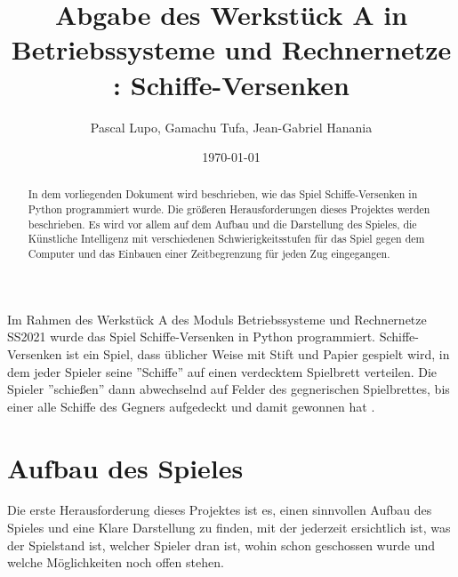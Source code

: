 \documentclass{article}
\title{Abgabe des Werkstück A in Betriebssysteme und Rechnernetze : Schiffe-Versenken}
\author{Pascal Lupo, Gamachu Tufa, Jean-Gabriel Hanania}
\date{\today}
\begin{document}
\maketitle
\thispagestyle{empty} %

\begin{abstract}
    In dem vorliegenden Dokument wird beschrieben, wie das Spiel Schiffe-Versenken in Python programmiert wurde. Die größeren Herausforderungen dieses Projektes werden beschrieben. Es wird vor allem auf dem Aufbau und die Darstellung des Spieles, die Künstliche Intelligenz mit verschiedenen Schwierigkeitsstufen für das Spiel gegen dem Computer und das Einbauen einer Zeitbegrenzung für jeden Zug eingegangen.
\end{abstract}

\section*{}
    Im Rahmen des Werkstück A des Moduls Betriebssysteme und Rechnernetze SS2021 wurde das Spiel Schiffe-Versenken in Python programmiert. Schiffe-Versenken ist ein Spiel, dass üblicher Weise mit Stift und Papier gespielt wird, in dem jeder Spieler seine ''Schiffe'' auf einen verdecktem Spielbrett verteilen. Die Spieler ''schießen'' dann abwechselnd auf Felder des gegnerischen Spielbrettes, bis einer alle Schiffe des Gegners aufgedeckt und damit gewonnen hat .


\section{Aufbau des Spieles}
    Die erste Herausforderung dieses Projektes ist es, einen sinnvollen Aufbau des Spieles und eine Klare Darstellung zu finden, mit der jederzeit ersichtlich ist, was der Spielstand ist, welcher Spieler dran ist, wohin schon geschossen wurde und welche Möglichkeiten noch offen stehen.
\end{document}
